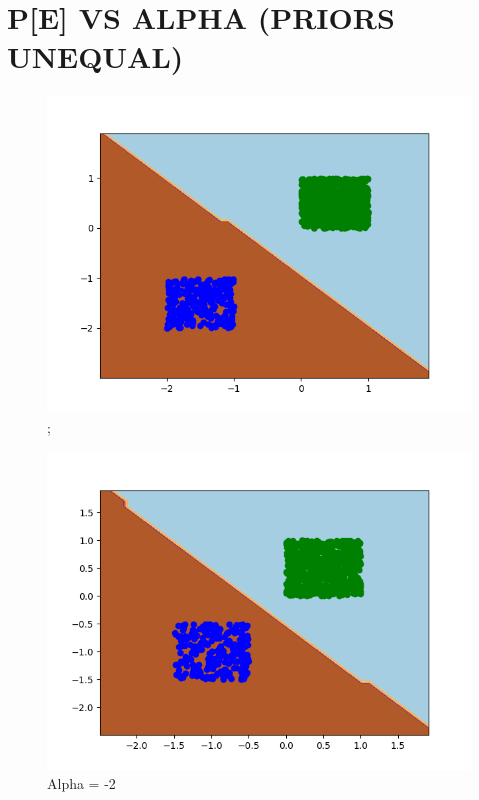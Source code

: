\documentclass{article}
\begin{document}
\section{\MakeUppercase{P[E] vs Alpha (Priors Unequal)}}
\begin{figure}[!htb]
	\begin{minipage}{0.24\textwidth}
		\centering
		\includegraphics[scale=0.24]{../unequalpriors/this0.png};
	\caption{Alpha = -2}
	\end{minipage}
	\begin{minipage}{0.24\textwidth}
			\centering
			\includegraphics[scale=0.24]{../unequalpriors/this4.png}

\end{minipage}
\end{figure}
\end{document}
